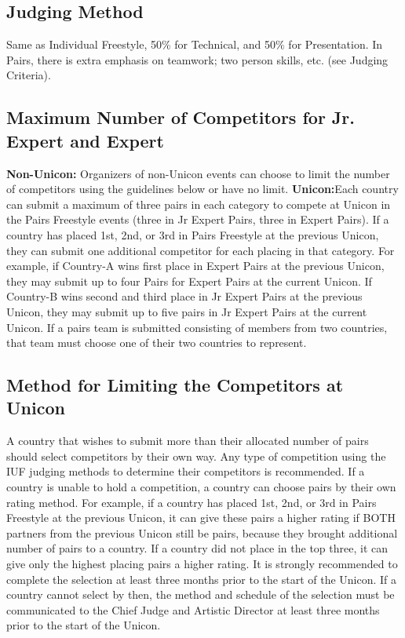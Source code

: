 \subsection{Judging Method}
Same as Individual Freestyle, 50\% for Technical, and 50\% for Presentation.
In Pairs, there is extra emphasis on teamwork; two person skills, etc.
(see Judging Criteria).

\subsection{Maximum Number of Competitors for Jr. Expert and Expert}
\textbf{Non-Unicon:} Organizers of non-Unicon events can choose to limit the number of competitors using the guidelines below or have no limit. 
\textbf{Unicon:}Each country can submit a maximum of three pairs in each category to compete at Unicon in the Pairs Freestyle events (three in Jr Expert Pairs, three in Expert Pairs).
If a country has placed 1st, 2nd, or 3rd in Pairs Freestyle at the previous Unicon, they can submit one additional competitor for each placing in that category.
For example, if Country-A wins first place in Expert Pairs at the previous Unicon, they may submit up to four Pairs for Expert Pairs at the current Unicon.
If Country-B wins second and third place in Jr Expert Pairs at the previous Unicon, they may submit up to five pairs in Jr Expert Pairs at the current Unicon.
If a pairs team is submitted consisting of members from two countries, that team must choose one of their two countries to represent.

\subsection{Method for Limiting the Competitors at Unicon}
A country that wishes to submit more than their allocated number of pairs should select competitors by their own way.
Any type of competition using the IUF judging methods to determine their competitors is recommended.
If a country is unable to hold a competition, a country can choose pairs by their own rating method.
For example, if a country has placed 1st, 2nd, or 3rd in Pairs Freestyle at the previous Unicon, it can give these pairs a higher rating if BOTH partners from the previous Unicon still be pairs, because they brought additional number of pairs to a country.
If a country did not place in the top three, it can give only the highest placing pairs a higher rating.
It is strongly recommended to complete the selection at least three months prior to the start of the Unicon.
If a country cannot select by then, the method and schedule of the selection must be communicated to the Chief Judge and Artistic Director at least three months prior to the start of the Unicon.

